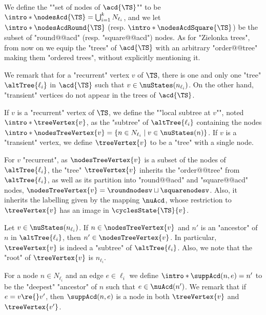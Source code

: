 \documentclass{theoretics}
\begin{document}
\AP We define the ""set of nodes of $\acd{\TS}$"" to be $\intro*\nodesAcd{\TS} = \bigcup_{i = 1}^k N_{\ell_i}$, and we let $\intro*\nodesAcdRound{\TS}$ (resp. $\intro*\nodesAcdSquare{\TS}$) be the subset of "round@@acd" (resp. "square@@acd") nodes. 
As for "Zielonka trees", from now on we equip the "trees" of $\acd{\TS}$ with an arbitrary "order@@tree" making them "ordered trees", without explicitly mentioning it.


We remark that for a "recurrent" vertex $v$ of $\TS$, there is one and only one "tree" $\altTree{\ell_i}$ in $\acd{\TS}$ such that $v\in \nuStates(n_{\ell_i})$. On the other hand, "transient" vertices do not appear in the trees of $\acd{\TS}$.


\AP If $v$ is a "recurrent" vertex of $\TS$, we define the ""local subtree at $v$"", noted $\intro*\treeVertex{v}$, as the "subtree" of $\altTree{\ell_i}$ containing the nodes 
$ \intro*\nodesTreeVertex{v} = \{ n \in N_{\ell_i} \mid v\in \nuStates(n)\}$.
 If $v$ is a "transient" vertex, we define $\treeVertex{v}$ to be a "tree" with a single node.

For $v$ "recurrent", as $\nodesTreeVertex{v}$ is a subset of the nodes of $\altTree{\ell_i}$, the "tree" $\treeVertex{v}$ inherits the "order@@tree" from $\altTree{\ell_i}$, as well as its partition into "round@@acd" and "square@@acd" nodes, $\nodesTreeVertex{v} = \roundnodesv \sqcup \squarenodesv$. Also, it inherits the labelling given by the mapping $\nuAcd$, whose restriction to $\treeVertex{v}$ has an image in $\cyclesState{\TS}{v}$.

 

\begin{remark}\label{rmk-acd:treeVertex-closed-by-ancestor}
	Let $v\in \nuStates(n_{\ell_i})$. If $n\in \nodesTreeVertex{v}$ and $n'$ is an "ancestor" of $n$ in $\altTree{\ell_i}$, then $n'\in \nodesTreeVertex{v}$. In particular, $\treeVertex{v}$ is indeed a "subtree" of $\altTree{\ell_i}$. Also, we note that the "root" of $\treeVertex{v}$ is $n_{\ell_i}$.
\end{remark}


\AP For a node $n\in N_{\ell_i}$ and an edge $e\in \ell_i$ we define $\intro*\suppAcd(n,e) = n'$ to be the "deepest" "ancestor" of $n$ such that $e\in \nuAcd(n')$. We remark that if $e = v\re{} v'$, then $\suppAcd(n,e)$ is a node in both $\treeVertex{v}$ and $\treeVertex{v'}$. 
\end{document}
